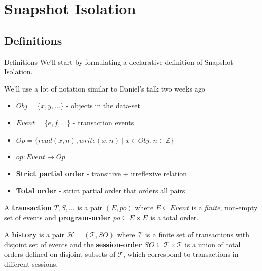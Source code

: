 \documentclass{beamer}
\begin{document}


\section{Snapshot Isolation}
\subsection{Definitions}
\begin{frame}{Definitions}
	We'll start by formulating a declarative definition of Snapshot Isolation.
\end{frame}

\begin{frame}
	We'll use a lot of notation similar to Daniel's talk two weeks ago
	\begin{itemize}
		\item $ Obj =  \{ x, y, \dots \} $ - objects in the data-set
		\item $ Event = \{ e, f, \dots \} $ - transaction events
		\item $ Op = \{ read(x,n), write(x, n) \mid x \in Obj, n \in \mathbb{Z}\} $ 
		\item $ op: Event \rightarrow Op $
	\end{itemize}
\end{frame}

\begin{frame}
	\begin{itemize}
		\item \textbf{Strict partial order} - transitive + irreflexive relation
		\item \textbf{Total order} - strict partial order that orders all pairs
	\end{itemize}
\end{frame}

\begin{frame}
	A \textbf{transaction} $ T, S, \dots $ is a pair $ (E, po ) $ where $ E \subseteq Event $ is a \emph{finite}, non-empty set of events and \textbf{program-order} $ po \subseteq E \times E $ is a total order.  \\
\end{frame}

\begin{frame}
	A \textbf{history} is a pair $ \mathcal{H} = (\mathcal{T},SO) $ where $\mathcal{T}$ is a finite set of transactions with disjoint set of events and the \textbf{session-order} $ SO \subseteq \mathcal{T} \times \mathcal{T} $ is a union of total orders defined on disjoint subsets of $\mathcal{T}$, which correspond to transactions in different sessions.
\end{frame}
\end{document}
